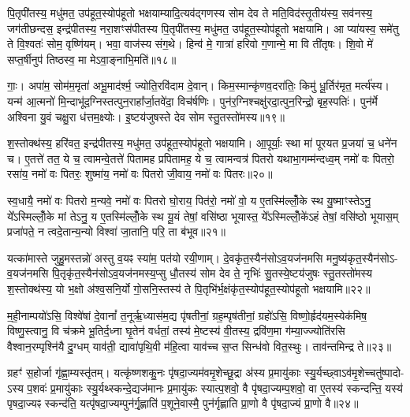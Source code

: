 पि॒तृपी॑तस्य॒ मधु॑मत॒ उप॑हूत॒स्योप॑हूतो भक्षयाम्यादि॒त्यव॑द्गणस्य सोम देव ते मति॒विद॑स्तृ॒तीय॑स्य॒ सव॑नस्य॒ जग॑तीछन्दस॒ इन्द्र॑पीतस्य॒ नरा॒शꣳस॑पीतस्य पि॒तृपी॑तस्य॒ मधु॑मत॒ उप॑हूत॒स्योप॑हूतो भक्षयामि। आ प्या॑यस्व॒ समे॑तु ते वि॒श्वतः॑ सोम॒ वृष्णि॑यम्। भवा॒ वाज॑स्य संग॒थे। हिन्व॑ मे॒ गात्रा॑ हरिवो ग॒णान्मे॒ मा वि ती॑तृषः। शि॒वो मे॑ सप्त॒र्\mbox{}षीनुप॑ तिष्ठस्व॒ मा मे\-ऽवा॒ङ्नाभि॒मति॑॥१८॥

गाः॒। अपा॑म॒ सोम॑म॒मृता॑ अभू॒माद॑र्श्म॒ ज्योति॒रवि॑दाम दे॒वान्। किम॒स्मान्कृ॑णव॒दरा॑तिः॒ किमु॑ धू॒र्तिर॑मृत॒ मर्त्य॑स्य। यन्म॑ आ॒त्मनो॑ मि॒न्दाभू॑द॒ग्निस्तत्पुन॒राहा᳚र्जा॒तवे॑दा॒ विच॑र्\mbox{}षणिः। पुन॑र॒ग्निश्चक्षु॑रदा॒त्पुन॒रिन्द्रो॒ बृह॒स्पतिः॑। पुन॑र्मे अश्विना यु॒वं चक्षु॒रा ध॑त्तम॒क्ष्योः। इ॒ष्टय॑जुषस्ते देव सोम स्तु॒तस्तो॑मस्य॥१९॥

श॒स्तोक्थ॑स्य॒ हरि॑वत॒ इन्द्र॑पीतस्य॒ मधु॑मत॒ उप॑हूत॒स्योप॑हूतो भक्षयामि। आ॒पूर्याः॒ स्था मा॑ पूरयत प्र॒जया॑ च॒ धने॑न च। ए॒तत्ते॑ तत॒ ये च॒ त्वामन्वे॒तत्ते॑ पितामह प्रपितामह॒ ये च॒ त्वामन्वत्र॑ पितरो यथाभा॒गम्म॑न्दध्व॒म् नमो॑ वः पितरो॒ रसा॑य॒ नमो॑ वः पितरः॒ शुष्मा॑य॒ नमो॑ वः पितरो जी॒वाय॒ नमो॑ वः पितरः॥२०॥

स्व॒धायै॒ नमो॑ वः पितरो म॒न्यवे॒ नमो॑ वः पितरो घो॒राय॒ पित॑रो॒ नमो॑ वो॒ य ए॒तस्मि॑ल्लोँ॒के स्थ यु॒ष्माꣳस्ते\-ऽनु॒ ये᳚\-ऽस्मिल्लोँ॒के मां ते\-ऽनु॒ य ए॒तस्मि॑ल्लोँ॒के स्थ यू॒यं तेषां॒ वसि॑ष्ठा भूयास्त॒ ये᳚\-ऽस्मिल्लोँ॒के॑\-ऽहं तेषां॒ वसि॑ष्ठो भूयास॒म् प्रजा॑पते॒ न त्वदे॒तान्य॒न्यो विश्वा॑ जा॒तानि॒ परि॒ ता ब॑भूव॥२१॥

यत्का॑मास्ते जुहु॒मस्तन्नो॑ अस्तु व॒यꣴ स्या॑म॒ पत॑यो रयी॒णाम्। दे॒वकृ॑त॒स्यैन॑सो\-ऽव॒यज॑नमसि मनु॒ष्य॑कृत॒स्यैन॑सो\-ऽ- व॒यज॑नमसि पि॒तृकृ॑त॒स्यैन॑सो\-ऽव॒यज॑नमस्य॒प्सु धौ॒तस्य॑ सोम देव ते॒ नृभिः॑ सु॒तस्ये॒ष्टय॑जुषः स्तु॒तस्तो॑मस्य श॒स्तोक्थ॑स्य॒ यो भ॒क्षो अ॑श्व॒सनि॒र्यो गो॒सनि॒स्तस्य॑ ते पि॒तृभि॑र्भ॒क्षंकृ॑त॒स्योप॑हूत॒स्योप॑हूतो भक्षयामि॥२२॥

{}

म॒ही॒नाम्पयो॑\-ऽसि॒ विश्वे॑षां दे॒वानां᳚ त॒नूर्\mbox{}ऋ॒ध्यास॑म॒द्य पृ॑षतीनां॒ ग्रह॒म्पृष॑तीनां॒ ग्रहो॑\-ऽसि॒ विष्णो॒र्\mbox{}हृद॑यम॒स्येक॑मिष॒ विष्णु॒स्त्वानु॒ वि च॑क्रमे भू॒तिर्द॒ध्ना घृ॒तेन॑ वर्धतां॒ तस्य॑ मे॒ष्टस्य॑ वी॒तस्य॒ द्रवि॑ण॒मा ग॑म्या॒ज्ज्योति॑रसि वैश्वान॒रम्पृश्नि॑यै दु॒ग्धम् याव॑ती॒ द्यावा॑पृथि॒वी म॑हि॒त्वा याव॑च्च स॒प्त सिन्ध॑वो वित॒स्थुः। ताव॑न्तमिन्द्र ते॥२३॥

ग्रहꣳ॑ स॒होर्जा गृ॑ह्णा॒म्यस्तृ॑तम्। यत्कृ॑ष्णशकु॒नः पृ॑षदा॒ज्यम॑वमृ॒शेच्छू॒द्रा अ॑स्य प्र॒मायु॑काः स्यु॒र्यच्छ्वा\-ऽव॑मृ॒शेच्चतु॑ष्पादो- \-ऽस्य प॒शवः॑ प्र॒मायु॑काः स्यु॒र्यथ्स्कन्दे॒द्यज॑मानः प्र॒मायु॑कः स्यात्प॒शवो॒ वै पृ॑षदा॒ज्यम्प॒शवो॒ वा ए॒तस्य॑ स्कन्दन्ति॒ यस्य॑ पृषदा॒ज्यꣴ स्कन्द॑ति॒ यत्पृ॑षदा॒ज्यम्पुन॑र्गृ॒ह्णाति॑ प॒शूने॒वास्मै॒ पुन॑र्गृह्णाति प्रा॒णो वै पृ॑षदा॒ज्यं प्रा॒णो वै॥२४॥

